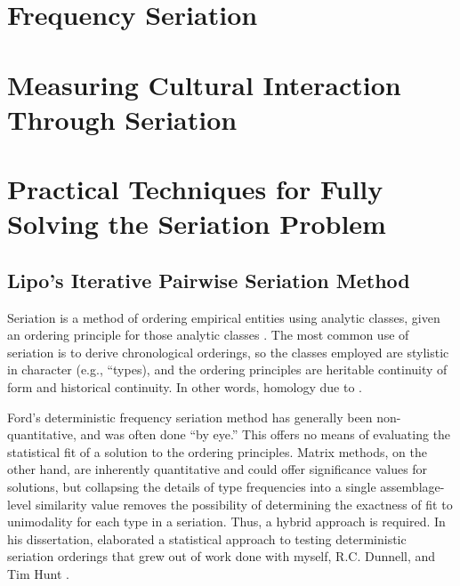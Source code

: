 \begin{description}[leftmargin=-1\labelwidth]
\item[\textsc{Overview}] \lipsum[1]
\item[\textsc{Contents}] \lipsum[2]
\end{description}




\section{Frequency Seriation}
\label{sec:seriation-frequency}



\section{Measuring Cultural Interaction Through Seriation}
\label{sec:measuring-interaction-seriation}



\section{Practical Techniques for Fully Solving the Seriation Problem}
\label{sec:full-solution-seriation-techniques}


\subsection{Lipo's Iterative Pairwise Seriation Method}
\label{sec:lipo-dissertation-seriations}

Seriation is a method of ordering empirical entities using analytic classes, given an ordering principle for those analytic classes \citep{dunnell1970seriation}.  The most common use of seriation is to derive chronological orderings, so the classes employed are stylistic in character (e.g., ``\culthistl types), and the ordering principles are heritable continuity of form and historical continuity.  In other words, homology due to \ct \citep{8961,lyman1997rise,o1999seriation,lyman2006measuring}.  

Ford's deterministic frequency seriation method has generally been non-quantitative, and was often done ``by eye.''  This offers no means of evaluating the statistical fit of a solution to the ordering principles.  Matrix methods, on the other hand, are inherently quantitative and could offer significance values for solutions, but collapsing the details of type frequencies into a single assemblage-level similarity value removes the possibility of determining the exactness of fit to unimodality for each type in a seriation.  Thus, a hybrid approach is required.  In his dissertation, \citet{Lipo2001b} elaborated a statistical approach to testing deterministic seriation orderings that grew out of work done with myself, R.C. Dunnell, and Tim Hunt \citeyearpar{Lipo1997}.  

